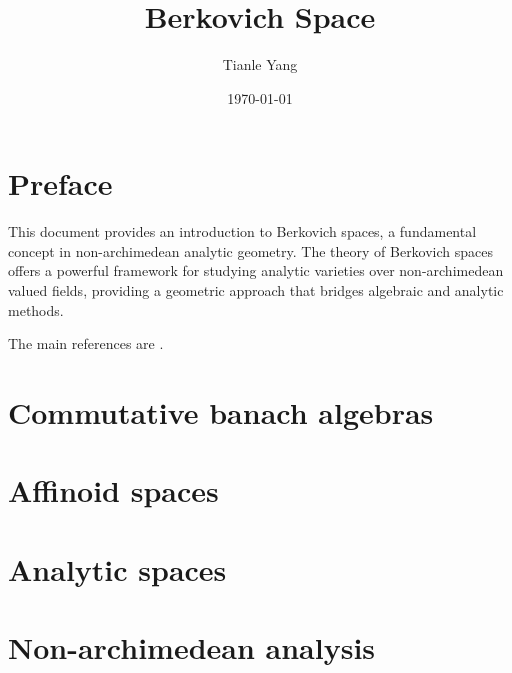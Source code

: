 \documentclass[sectionlevel=book]{noteformyself}
\title{Berkovich Space}
\author{Tianle Yang}
\date{\today}
\begin{document}
   \maketitle

   \frontmatter

   \chapter*{Preface}

   This document provides an introduction to Berkovich spaces, a fundamental concept in non-archimedean analytic geometry. 
   The theory of Berkovich spaces offers a powerful framework for studying analytic varieties over non-archimedean valued fields, providing a geometric approach that bridges algebraic and analytic methods.

   The main references are \cite{Ber90,BGR84}.


   \tableofcontents %

   \mainmatter


   \chapter{Commutative banach algebras}
      
      

   \chapter{Affinoid spaces}
      
      
      

   \chapter{Analytic spaces}

   \appendix

   \chapter{Non-archimedean analysis}
      
      

   \printbibliography[heading=bibintoc, title={References}] %
\end{document}
